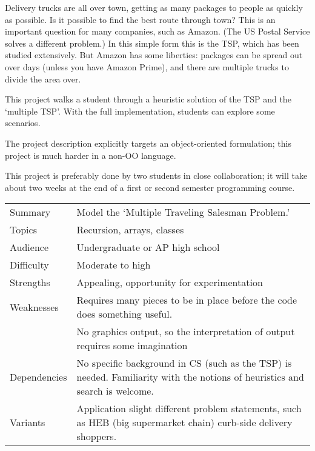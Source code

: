 
Delivery trucks are all over town, getting as many packages to people
as quickly as possible. Is it possible to find the best route
through town? This is an important question for many companies,
such as Amazon. (The US Postal Service solves a different problem.)
In this simple form this is the \ac{TSP},
which has been studied extensively.
But Amazon has some liberties: packages can be spread out
over days (unless you have Amazon Prime), and there are multiple trucks
to divide the area over.

This project walks a student through a
heuristic solution of the \ac{TSP} and the `multiple TSP'.
With the full implementation, students can explore some scenarios.

The project description explicitly targets an object-oriented formulation;
this project is much harder in a non-OO language.

This project is preferably done by two students in close collaboration;
it will take about two weeks
at the end of a first or second semester programming course.

\newpage

\begin{tabular}{|l|p{5in}|}
  \hline
  Summary&Model the `Multiple Traveling Salesman Problem.'
  \\
  Topics&Recursion, arrays, classes
  \\
  Audience&Undergraduate or AP high school
  \\
  Difficulty&Moderate to high
  \\
  Strengths&Appealing, opportunity for experimentation
  \\
  Weaknesses&Requires many pieces to be in place before the code does something useful.
  \\
  &No graphics output, so the interpretation of output requires some imagination
  \\
  Dependencies&No specific background in CS (such as the \ac{TSP}) is needed.
  Familiarity with the notions of heuristics and search is welcome.
  \\
  Variants&Application slight different problem statements,
  such as HEB (big supermarket chain) curb-side delivery shoppers.
  \\
  \hline
\end{tabular}
